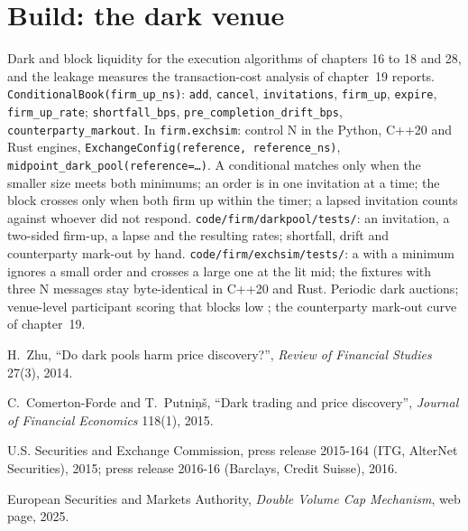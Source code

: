 \section{Build: the dark venue}\label{bld:mx:dark-pools-and-blocks:darkpool}

\begin{build}
 Dark and block liquidity for the execution algorithms of chapters 16 to 18 and 28, and the leakage measures the transaction-cost
analysis of chapter~19 reports.
 \texttt{ConditionalBook(firm\_up\_ns)}: \texttt{add}, \texttt{cancel}, \texttt{invitations}, \texttt{firm\_up}, \texttt{expire},
\texttt{firm\_up\_rate}; \texttt{shortfall\_bps}, \texttt{pre\_completion\_drift\_bps}, \texttt{counterparty\_markout}. In \texttt{firm.exchsim}: control
N in the Python, C++20 and Rust engines, \texttt{ExchangeConfig(reference, reference\_ns)}, \texttt{midpoint\_dark\_pool(reference=\dots)}.
 A conditional matches only when the smaller size meets both minimums; an order is in one invitation at a time; the block crosses only
when both firm up within the timer; a lapsed invitation counts against whoever did not respond.
 \texttt{code/firm/darkpool/tests/}: an invitation, a two-sided firm-up, a lapse and the resulting rates; shortfall, drift and
counterparty mark-out by hand. \texttt{code/firm/exchsim/tests/}: a  with a minimum ignores a small order and crosses a large one at the lit
mid; the fixtures with three N messages stay byte-identical in C++20 and Rust.
 Periodic dark auctions; venue-level participant scoring that blocks low ; the counterparty mark-out curve of chapter~19.
\end{build}

\begin{omsources}
\item H.~Zhu, ``Do dark pools harm price discovery?'', \emph{Review of Financial Studies} 27(3), 2014.
\item C.~Comerton-Forde and T.~Putni\c{n}\v{s}, ``Dark trading and price discovery'', \emph{Journal of Financial Economics} 118(1), 2015.
\item U.S. Securities and Exchange Commission, press release 2015-164 (ITG, AlterNet Securities), 2015; press release 2016-16 (Barclays, Credit Suisse),
2016.
\item European Securities and Markets Authority, \emph{Double Volume Cap Mechanism}, web page, 2025.
\end{omsources}

